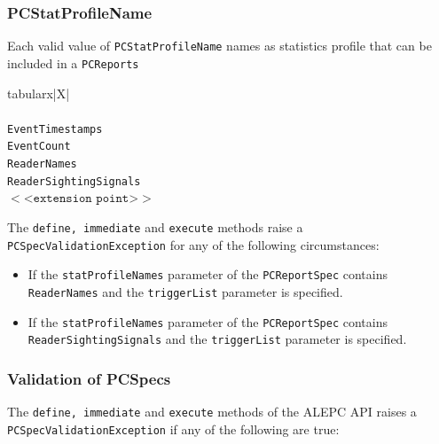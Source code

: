 \documentclass[11pt,a4paper,oneside]{article}
\newenvironment{bbox}%
{\begin{table}[h!]\begin{threeparttable}}%
{\end{threeparttable}\end{table}\FloatBarrier}
\newenvironment{bbox}
{\ifvmode\IgnorePar\fi \EndP\Tg<div class='bbox'>}{\Tg</div>\IgnoreIndent}
\begin{document}
\subsubsection{PCStatProfileName}
\label{subsec: PCStat}
Each valid value of \texttt{PCStatProfileName} names as statistics profile that can be included in a \texttt{PCReports}

\begin{bbox}
\begin{edtable}{tabularx}{\linewidth}{|X|}
\hline 
{}
\\
\\
\texttt{EventTimestamps}\\
\texttt{EventCount}\\
\texttt{ReaderNames}\\
\texttt{ReaderSightingSignals}\\
$<$<$\texttt{extension point}$>$>$\\
\hline
\end{edtable}
\end{bbox}

The \texttt{define, immediate} and \texttt{execute} methods raise a \ifpdf\\\fi\texttt{PCSpecValidationException} for any of the following circumstances:

\begin{itemize}
\item	If the \texttt{statProfileNames} parameter of the \texttt{PCReportSpec} contains \ifpdf\\\fi \texttt{ReaderNames} and the \texttt{triggerList} parameter is specified.
\item	If the \texttt{statProfileNames} parameter of the \texttt{PCReportSpec} contains \ifpdf\\\fi\texttt{ReaderSightingSignals} and the \texttt{triggerList} parameter is specified.
\end{itemize}

\subsubsection{Validation of PCSpecs}
The \texttt{define, immediate} and \texttt{execute} methods of the ALEPC API raises a\ifpdf\\\fi \texttt{PCSpecValidationException} if any of the following are true:
\end{document}
